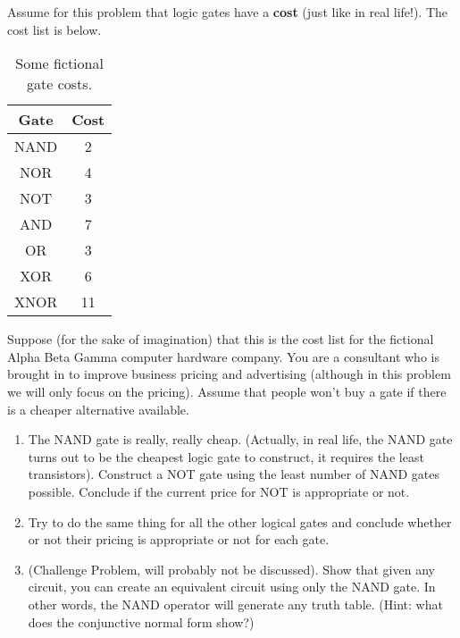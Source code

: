 Assume for this problem that logic gates have a \textbf{cost} (just like in real life!). The cost list is below.

\begin{table}[H]
	\centering
	\renewcommand{\arraystretch}{1.2}
	\renewcommand{\tabcolsep}{2cm}
	\begin{tabular}{|c|c|} \hline 
		{\textbf{Gate}} & {\textbf{Cost}} \\ \hline
		NAND & 2 \\ \hline
		NOR & 4\\ \hline
		NOT & 3\\ \hline
		AND & 7\\ \hline
		OR & 3\\ \hline
		XOR & 6 \\ \hline
		XNOR & 11 \\ \hline
	\end{tabular}
	\caption{Some fictional gate costs.}
	\label{tbl:costs}
\end{table}
Suppose (for the sake of imagination) that this is the cost list for the fictional Alpha Beta Gamma computer hardware company. You are a consultant who is brought in to improve business pricing and advertising (although in this problem we will only focus on the pricing). Assume that people won't buy a gate if there is a cheaper alternative available. 

\begin{enumerate}
    \item The NAND gate is really, really cheap. (Actually, in real life, the NAND gate turns out to be the cheapest logic gate to construct, it requires the least transistors). Construct a NOT gate using the least number of NAND gates possible. Conclude if the current price for NOT is appropriate or not.
    
    \item Try to do the same thing for all the other logical gates and conclude whether or not their pricing is appropriate or not for each gate.
    
    \item (Challenge Problem, will probably not be discussed). Show that given any circuit, you can create an equivalent circuit using only the NAND gate. In other words, the NAND operator will generate any truth table. (Hint: what does the conjunctive normal form show?)
\end{enumerate}